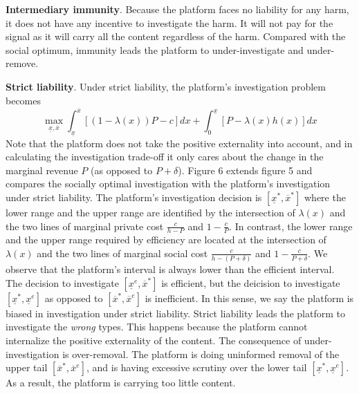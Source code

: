 \textbf{Intermediary immunity}.
Because the platform faces no liability for any harm, it does not have any incentive to investigate the harm. It will not pay for the signal as it will carry all the content regardless of the harm. Compared with the social optimum, immunity leads the platform to under-investigate and under-remove. 

\textbf{Strict liability}.
Under strict liability, the platform's investigation problem becomes 
\begin{equation}
    \max_{\underline{x},\overline{x}} \int_{\underline{x}}^{\overline{x}} [(1-\lambda(x))P-c]dx + \int_0^{\underline{x}} [P-\lambda(x)h(x)]dx 
\end{equation}
Note that the platform does not take the positive externality into account, and in calculating the investigation trade-off it only cares about the change in the marginal revenue $P$ (as opposed to $P+\delta$). 
Figure 6 extends figure 5 and compares the socially optimal investigation with the platform's investigation under strict liability. The platform's investigation decision is $[\underline{x}^*,\overline{x}^*]$ where the lower range and the upper range are identified by the intersection of $\lambda(x)$ and the two lines of marginal private cost $\frac{c}{h-P}$ and $1-\frac{c}{P}$. 
In contrast, the lower range and the upper range required by efficiency are located at the intersection of $\lambda(x)$ and the two lines of marginal social cost $\frac{c}{h-(P+\delta)}$ and $1-\frac{c}{P+\delta}$.  
We observe that the platform's interval is always lower than the efficient interval. The decision to investigate $[\underline{x}^e,\overline{x}^*]$ is efficient, but the deicision to investigate $[\underline{x}^*,\underline{x}^e]$ as opposed to $[\overline{x}^*,\overline{x}^e]$ is inefficient. In this sense, we say the platform is biased in investigation under strict liability. Strict liability leads the platform to investigate the \emph{wrong} types. This happens because the platform cannot internalize the positive externality of the content. The consequence of under-investigation is over-removal. The platform is doing uninformed removal of the upper tail $[\overline{x}^*,\overline{x}^e]$, and is having excessive scrutiny over the lower tail $[\underline{x}^*,\underline{x}^e]$. As a result, the platform is carrying too little content.

